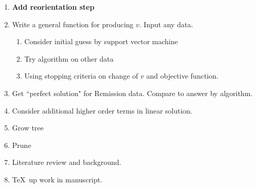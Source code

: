 \documentclass{article}
\begin{document}
\begin{enumerate}
\item \textbf{Add reorientation step}
\item Write a general function for producing $v$. Input any data. 
\begin{enumerate}
\item Consider initial guess by support vector machine
\item Try algorithm on other data
\item Using stopping criteria on change of $v$ and objective function. 
\end{enumerate}
\item Get ``perfect solution" for Remission data. Compare to answer by algorithm. 
\item Consider additional higher order terms in linear solution. 
\item Grow tree
\item Prune
\item Literature review and background.  
\item \TeX\ up work in manuscript. 
\end{enumerate}
\end{document}
